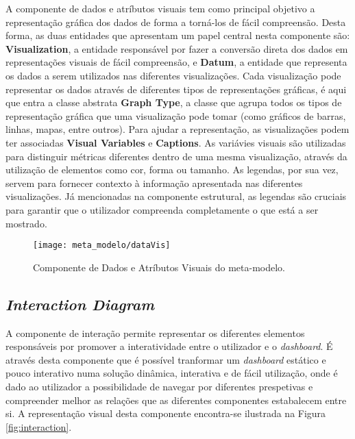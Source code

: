 A componente de dados e atríbutos visuais tem como principal objetivo a representação gráfica dos dados de forma a torná-los de fácil compreensão. Desta forma, as duas entidades que apresentam um papel central nesta componente são: \textbf{Visualization}, a entidade responsável por fazer a conversão direta dos dados em representações visuais de fácil compreensão, e \textbf{Datum}, a entidade que representa os dados a serem utilizados nas diferentes visualizações. Cada visualização pode representar os dados através de diferentes tipos de representações gráficas, é aqui que entra a classe abstrata \textbf{Graph Type}, a classe que agrupa todos os tipos de representação gráfica que uma visualização pode tomar (como gráficos de barras, linhas, mapas, entre outros). Para ajudar a representação, as visualizações podem ter associadas \textbf{Visual Variables} e \textbf{Captions}. As variávies visuais são utilizadas para distinguir métricas diferentes dentro de uma mesma visualização, através da utilização de elementos como cor, forma ou tamanho. As legendas, por sua vez, servem para fornecer contexto à informação apresentada nas diferentes visualizações. Já mencionadas na componente estrutural, as legendas são cruciais para garantir que o utilizador compreenda completamente o que está a ser mostrado.

\begin{figure}[htbp]
  \texttt{[image: meta\_modelo/dataVis]}
  \centering
  \caption{Componente de Dados e Atríbutos Visuais do meta-modelo.}
  \label{fig:comp_data_vis}
\end{figure}

\subsection{\textit{Interaction Diagram}} %
\label{sub:int_diagram}

A componente de interação permite representar os diferentes elementos responsáveis por promover a interatividade entre o utilizador e o \textit{dashboard}. É através desta componente que é possível tranformar um \textit{dashboard} estático e pouco interativo numa solução dinâmica, interativa e de fácil utilização, onde é dado ao utilizador a possibilidade de navegar por diferentes prespetivas e compreender melhor as relações que as diferentes componentes estabalecem entre si. A representação visual desta componente encontra-se ilustrada na Figura \ref{fig:interaction}.

